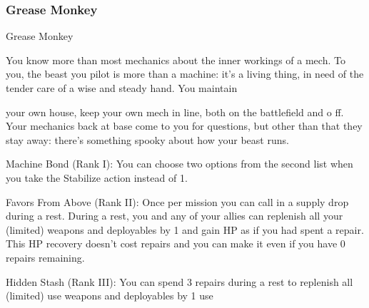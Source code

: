 \subsubsection{Grease Monkey}

                                              Grease Monkey

You know more than most mechanics about the inner workings of a mech. To you, the beast you pilot is
more than a machine: it’s a living thing, in need of the tender care of a wise and steady hand. You maintain




your own house, keep your own mech in line, both on the battlefield and o ff. Your mechanics back at base
come to you for questions, but other than that they stay away: there’s something spooky about how your
beast runs.

Machine Bond (Rank I): You can choose two options from the second list when you take the
Stabilize action instead of 1.

Favors From Above (Rank II): Once per mission you can call in a supply drop during a rest.
During a rest, you and any of your allies can replenish all your (limited) weapons and deployables
by 1 and gain HP as if you had spent a repair. This HP recovery doesn’t cost repairs and you can
make it even if you have 0 repairs remaining.

Hidden Stash (Rank III): You can spend 3 repairs during a rest to replenish all (limited) use
weapons and deployables by 1 use